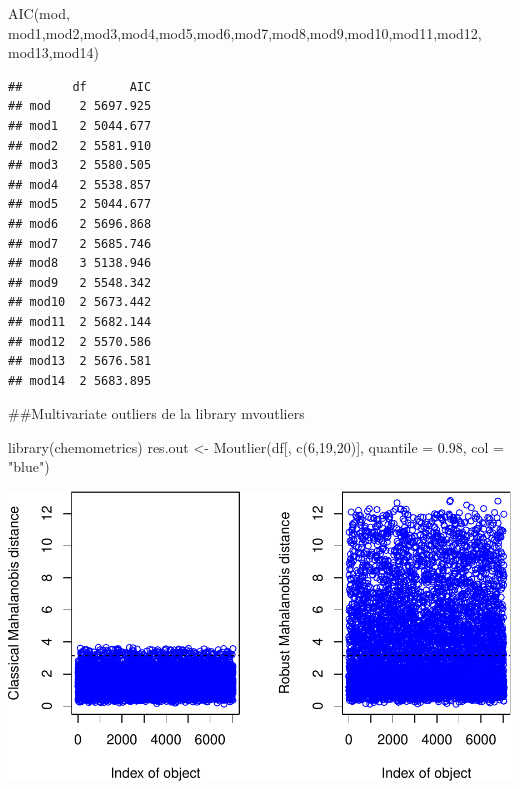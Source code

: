\documentclass[
  twoside]{article}
\newenvironment{Shaded}{\begin{snugshade}}{\end{snugshade}}
\newcommand{\AttributeTok}[1]{\textcolor[rgb]{0.77,0.63,0.00}{#1}}
\newcommand{\DecValTok}[1]{\textcolor[rgb]{0.00,0.00,0.81}{#1}}
\newcommand{\FloatTok}[1]{\textcolor[rgb]{0.00,0.00,0.81}{#1}}
\newcommand{\FunctionTok}[1]{\textcolor[rgb]{0.00,0.00,0.00}{#1}}
\newcommand{\NormalTok}[1]{#1}
\newcommand{\OtherTok}[1]{\textcolor[rgb]{0.56,0.35,0.01}{#1}}
\newcommand{\SpecialCharTok}[1]{\textcolor[rgb]{0.00,0.00,0.00}{#1}}
\newcommand{\StringTok}[1]{\textcolor[rgb]{0.31,0.60,0.02}{#1}}
\begin{document}
\begin{Shaded}
\begin{Highlighting}[]
\FunctionTok{AIC}\NormalTok{(mod, mod1,mod2,mod3,mod4,mod5,mod6,mod7,mod8,mod9,mod10,mod11,mod12, mod13,mod14)}
\end{Highlighting}
\end{Shaded}

\begin{verbatim}
##       df      AIC
## mod    2 5697.925
## mod1   2 5044.677
## mod2   2 5581.910
## mod3   2 5580.505
## mod4   2 5538.857
## mod5   2 5044.677
## mod6   2 5696.868
## mod7   2 5685.746
## mod8   3 5138.946
## mod9   2 5548.342
## mod10  2 5673.442
## mod11  2 5682.144
## mod12  2 5570.586
## mod13  2 5676.581
## mod14  2 5683.895
\end{verbatim}

\#\#Multivariate outliers de la library mvoutliers

\begin{Shaded}
\begin{Highlighting}[]
\FunctionTok{library}\NormalTok{(chemometrics)}
\NormalTok{res.out }\OtherTok{\textless{}{-}} \FunctionTok{Moutlier}\NormalTok{(df[, }\FunctionTok{c}\NormalTok{(}\DecValTok{6}\NormalTok{,}\DecValTok{19}\NormalTok{,}\DecValTok{20}\NormalTok{)], }\AttributeTok{quantile =} \FloatTok{0.98}\NormalTok{, }\AttributeTok{col =} \StringTok{"blue"}\NormalTok{)}
\end{Highlighting}
\end{Shaded}

\includegraphics{Assigment2_files/figure-latex/unnamed-chunk-83-1.pdf}

\begin{Shaded}
\end{Shaded}
\end{document}
